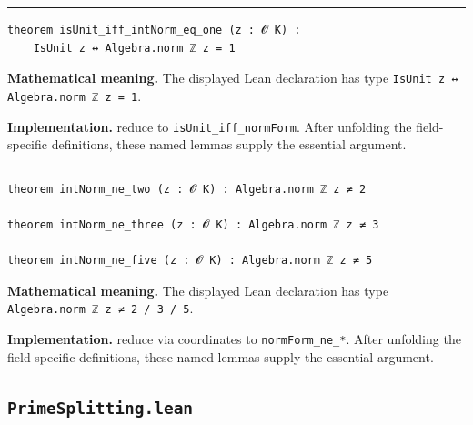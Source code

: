 \documentclass[UTF8,a4paper,11pt,fontset=fandol]{ctexart}
\theoremstyle{definition}
\newcommand{\statementsep}{\par\medskip\hrule\medskip}
\begin{document}
\statementsep
\begin{verbatim}
theorem isUnit_iff_intNorm_eq_one (z : 𝓞 K) :
    IsUnit z ↔ Algebra.norm ℤ z = 1
\end{verbatim}
\noindent\textbf{Mathematical meaning.} The displayed Lean declaration has type \texttt{IsUnit z ↔ Algebra.\allowbreak{}norm ℤ z = 1}.\par
\noindent\textbf{Implementation.} reduce to \texttt{isUnit\_\allowbreak{}iff\_\allowbreak{}normForm}. After unfolding the field-specific definitions, these named lemmas supply the essential argument.\par
\statementsep
\begin{verbatim}
theorem intNorm_ne_two (z : 𝓞 K) : Algebra.norm ℤ z ≠ 2

theorem intNorm_ne_three (z : 𝓞 K) : Algebra.norm ℤ z ≠ 3

theorem intNorm_ne_five (z : 𝓞 K) : Algebra.norm ℤ z ≠ 5
\end{verbatim}
\noindent\textbf{Mathematical meaning.} The displayed Lean declaration has type \texttt{Algebra.\allowbreak{}norm ℤ z ≠ 2 /\allowbreak{} 3 /\allowbreak{} 5}.\par
\noindent\textbf{Implementation.} reduce via coordinates to \texttt{normForm\_\allowbreak{}ne\_\allowbreak{}*}. After unfolding the field-specific definitions, these named lemmas supply the essential argument.\par

\subsection{\texttt{PrimeSplitting.lean}}
\end{document}
